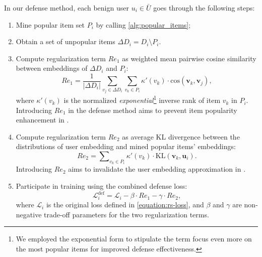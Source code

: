 In our defense method, each benign user $u_i \in \bar{{U}}$ goes through the following steps:
\begin{enumerate}[leftmargin=*]

\item Mine popular item set ${P}_i$ by calling \cref{alg:popular_items};

\item Obtain a set of unpopular items $\Delta D_i = D_i \setminus P_i$.

\item Compute regularization term $\mathit{Re}_1$ as weighted mean pairwise cosine similarity between embeddings of $\Delta D_i$ and $P_i$:
\begin{equation} \label{regul1}
\mathit{Re}_1 = \frac{1}{|\Delta {D}_i|} \sum\limits_{v_j \in \Delta {D}_i} \sum_{v_k\in{P}_{i}} \kappa'(v_k) \cdot \text{cos}(\mathbf{v}_k,\mathbf{v}_j),
\end{equation}
where $\kappa'(v_k)$ is the normalized \emph{exponential}\footnote{We employed the exponential form to stipulate the term focus even more on the most popular items for improved defense effectiveness.} inverse rank of item $v_k$ in $P_i$.
Introducing $\mathit{Re}_1$ in the defense method aims to prevent item popularity enhancement in \modelI{}.

\item Compute regularization term $\mathit{Re}_2$ as average KL divergence between the distributions of user embedding and mined popular items' embeddings:
\begin{equation} \label{regul2}
\mathit{Re}_{2} =
 \sum\nolimits_{v_k\in{P}_{i}} \kappa'(v_k) \cdot \text{KL}(\mathbf{v}_k, \mathbf{u}_i).
\end{equation}
Introducing $\mathit{Re}_{2}$ aims to invalidate the user embedding approximation in \modelII{}. 

\item Participate in training using the combined defense loss:
\begin{equation} \label{defense-loss}
    \mathcal{L}^\text{def}_i = \mathcal{L}_i - \beta \cdot \mathit{Re}_{1} - \gamma \cdot \mathit{Re}_{2},
\end{equation}
where $\mathcal{L}_i$ is the original loss defined in \cref{equation:rs-loss}, and $\beta$ and $\gamma$ are non-negative trade-off parameters for the two regularization terms.
\end{enumerate}

